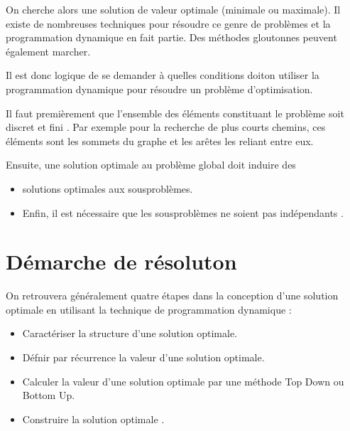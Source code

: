 \documentclass[letterpaper,10pt,english]{jupyterBook}
\begin{document}
\sphinxAtStartPar
On cherche alors une solution de valeur optimale (minimale ou maximale).
Il existe de nombreuses techniques pour résoudre ce genre de problèmes et
la programmation dynamique en fait partie. Des méthodes gloutonnes peuvent également marcher.

\sphinxAtStartPar
Il est donc logique de se demander à quelles conditions doit\sphinxhyphen{}on utiliser la programmation dynamique pour résoudre un problème d’optimisation.

\sphinxAtStartPar
Il faut premièrement que l’ensemble des éléments constituant le problème soit discret et fini .
Par exemple pour la recherche de plus courts chemins, ces éléments sont les sommets du graphe et les arêtes les reliant entre eux.

\sphinxAtStartPar
Ensuite, une solution optimale au problème global doit induire des
\begin{itemize}
\item {} 
\sphinxAtStartPar
solutions optimales aux sous\sphinxhyphen{}problèmes.

\item {} 
\sphinxAtStartPar
Enfin, il est nécessaire que les sous\sphinxhyphen{}problèmes ne soient pas indépendants .

\end{itemize}


\section{Démarche de résoluton}
\label{\detokenize{notebooks/dynamicProgramming/ProgrammationDynamique:demarche-de-resoluton}}
\sphinxAtStartPar
On retrouvera généralement quatre étapes dans la conception d’une solution optimale en utilisant la technique de programmation dynamique :
\begin{itemize}
\item {} 
\sphinxAtStartPar
Caractériser la structure d’une solution optimale.

\item {} 
\sphinxAtStartPar
Défnir par récurrence la valeur d’une solution optimale.

\item {} 
\sphinxAtStartPar
Calculer la valeur d’une solution optimale par une méthode Top Down ou Bottom Up.

\item {} 
\sphinxAtStartPar
Construire la solution optimale .

\end{itemize}
\end{document}
